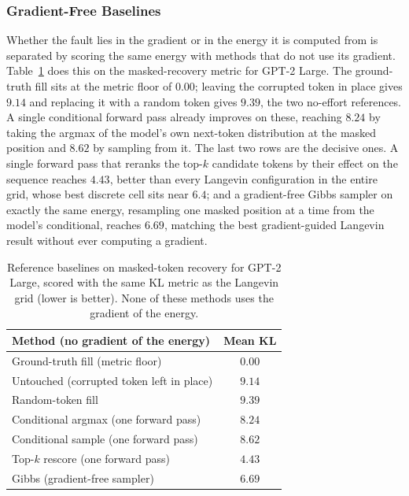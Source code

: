\subsubsection{Gradient-Free Baselines}
\label{sec:results-baselines}

Whether the fault lies in the gradient or in the energy it is computed from is separated by scoring the same energy with methods that do not use its gradient. Table~\ref{tab:baselines} does this on the masked-recovery metric for GPT-2 Large. The ground-truth fill sits at the metric floor of $0.00$; leaving the corrupted token in place gives $9.14$ and replacing it with a random token gives $9.39$, the two no-effort references. A single conditional forward pass already improves on these, reaching $8.24$ by taking the argmax of the model's own next-token distribution at the masked position and $8.62$ by sampling from it. The last two rows are the decisive ones. A single forward pass that reranks the top-$k$ candidate tokens by their effect on the sequence reaches $4.43$, better than every Langevin configuration in the entire grid, whose best discrete cell sits near $6.4$; and a gradient-free Gibbs sampler on exactly the same energy, resampling one masked position at a time from the model's conditional, reaches $6.69$, matching the best gradient-guided Langevin result without ever computing a gradient.

\begin{table}[t]
    \centering
    \small
    \begin{tabular}{lc}
        \toprule
        Method (no gradient of the energy) & Mean KL \\
        \midrule
        Ground-truth fill (metric floor)        & $0.00$ \\
        Untouched (corrupted token left in place) & $9.14$ \\
        Random-token fill                        & $9.39$ \\
        Conditional argmax (one forward pass)    & $8.24$ \\
        Conditional sample (one forward pass)    & $8.62$ \\
        Top-$k$ rescore (one forward pass)       & $4.43$ \\
        Gibbs (gradient-free sampler)            & $6.69$ \\
        \bottomrule
    \end{tabular}
    \caption[Gradient-free reference baselines on masked-token recovery.]{Reference baselines on masked-token recovery for GPT-2 Large, scored with the same KL metric as the Langevin grid (lower is better). None of these methods uses the gradient of the energy.}
    \label{tab:baselines}
\end{table}

